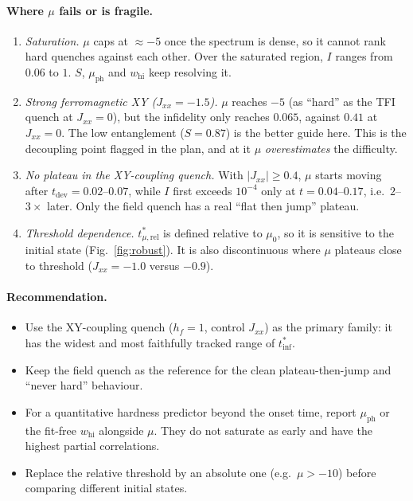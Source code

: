 \documentclass[11pt,a4paper]{article}
\newcommand{\inff}{I}
\newcommand{\tmur}{t^*_{\mu,\mathrm{rel}}}
\newcommand{\tinf}{t^*_{\mathrm{inf}}}
\begin{document}
\paragraph{Where $\mu$ fails or is fragile.}
\begin{enumerate}
  \item \emph{Saturation.} $\mu$ caps at $\approx-5$ once the spectrum is dense, so it cannot rank
    hard quenches against each other. Over the saturated region, $\inff$ ranges from $0.06$ to
    $1$. $S$, $\mu_{\mathrm{ph}}$ and $w_{\mathrm{hi}}$ keep resolving it.
  \item \emph{Strong ferromagnetic XY ($J_{xx}=-1.5$).} $\mu$ reaches $-5$ (as ``hard'' as the TFI
    quench at $J_{xx}=0$), but the infidelity only reaches $0.065$, against $0.41$ at $J_{xx}=0$.
    The low entanglement ($S=0.87$) is the better guide here. This is the decoupling point
    flagged in the plan, and at it $\mu$ \emph{overestimates} the difficulty.
  \item \emph{No plateau in the XY-coupling quench.} With $|J_{xx}|\ge0.4$, $\mu$ starts moving after
    $t_{\mathrm{dev}}=0.02$--$0.07$, while $\inff$ first exceeds $10^{-4}$ only at $t=0.04$--$0.17$,
    i.e.\ $2$--$3\times$ later. Only the field quench has a real
    ``flat then jump'' plateau.
  \item \emph{Threshold dependence.} $\tmur$ is defined relative to $\mu_0$, so it is sensitive to the
    initial state (Fig.~\ref{fig:robust}). It is also discontinuous where $\mu$ plateaus close to
    threshold ($J_{xx}=-1.0$ versus $-0.9$).
\end{enumerate}

\paragraph{Recommendation.}
\begin{itemize}
  \item Use the XY-coupling quench ($h_f=1$, control $J_{xx}$) as the primary family: it has the widest and most
    faithfully tracked range of $\tinf$.
  \item Keep the field quench as the reference for the clean plateau-then-jump and ``never hard''
    behaviour.
  \item For a quantitative hardness predictor beyond the onset time, report $\mu_{\mathrm{ph}}$ or
    the fit-free $w_{\mathrm{hi}}$ alongside $\mu$. They do not saturate as early and have the
    highest partial correlations.
  \item Replace the relative threshold by an absolute one (e.g.\ $\mu>-10$) before comparing
    different initial states.
\end{itemize}
\end{document}
